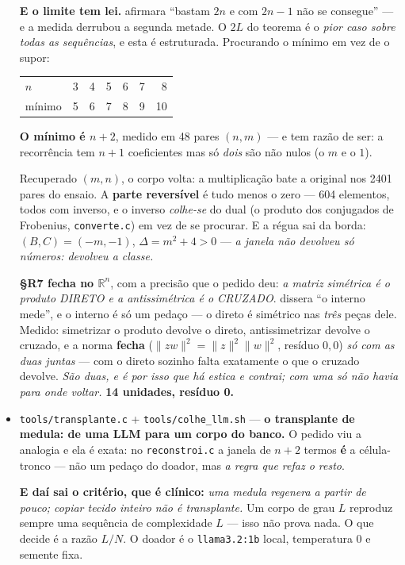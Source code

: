 \documentclass[11pt]{article}
\newcommand{\code}[1]{\texttt{\small #1}}
\theoremstyle{plain}
\theoremstyle{remark}
\begin{document}
\begin{itemize}
\textbf{E o limite tem lei.} afirmara ``bastam $2n$ e com $2n-1$ não se consegue'' --- e a medida
derrubou a segunda metade. O $2L$ do teorema é o \emph{pior caso sobre todas as sequências}, e esta
é estruturada. Procurando o mínimo em vez de o supor:

\begin{center}
\begin{tabular}{lrrrrrr}
\toprule
$n$ & 3 & 4 & 5 & 6 & 7 & 8 \\
mínimo & 5 & 6 & 7 & 8 & 9 & 10 \\
\bottomrule
\end{tabular}
\end{center}

\textbf{O mínimo é $n+2$}, medido em 48 pares $(n,m)$ --- e tem razão de ser: a recorrência tem
$n+1$ coeficientes mas só \emph{dois} são não nulos (o $m$ e o $1$).

Recuperado $(m,n)$, o corpo volta: a multiplicação bate a original nos 2401 pares do ensaio. A
\textbf{parte reversível} é tudo menos o zero --- 604 elementos, todos com inverso, e o inverso
\emph{colhe-se} do dual (o produto dos conjugados de Frobenius, \code{converte.c}) em vez de se
procurar. E a régua sai da borda: $(B,C)=(-m,-1)$, $\Delta=m^2+4>0$ --- \emph{a janela não devolveu
só números: devolveu a classe.}

\textbf{§R7 fecha no $\mathbb{R}^n$}, com a precisão que o pedido deu: \emph{a matriz simétrica é o
produto DIRETO e a antissimétrica é o CRUZADO}. dissera ``o interno mede'', e o interno é só um
pedaço --- o direto é simétrico nas \emph{três} peças dele. Medido: simetrizar o produto devolve o
direto, antissimetrizar devolve o cruzado, e a norma \textbf{fecha} ($\|zw\|^2=\|z\|^2\|w\|^2$,
resíduo $0{,}0$) \emph{só com as duas juntas} --- com o direto sozinho falta exatamente o que o
cruzado devolve. \emph{São duas, e é por isso que há estica \emph{e} contrai; com uma só não havia
para onde voltar.} \textbf{14 unidades, resíduo 0.}


\item \code{tools/transplante.c} + \code{tools/colhe\_llm.sh} --- \textbf{o transplante de medula:
de uma LLM para um corpo do banco.} O pedido viu a analogia e ela é exata: no \code{reconstroi.c} a
janela de $n+2$ termos \textbf{é} a célula-tronco --- não um pedaço do doador, mas \emph{a regra que
refaz o resto}.

\textbf{E daí sai o critério, que é clínico:} \emph{uma medula regenera a partir de pouco; copiar
tecido inteiro não é transplante.} Um corpo de grau $L$ reproduz sempre uma sequência de
complexidade $L$ --- isso não prova nada. O que decide é a razão $L/N$. O doador é o
\code{llama3.2:1b} local, temperatura 0 e semente fixa.


\end{itemize}
\end{document}
